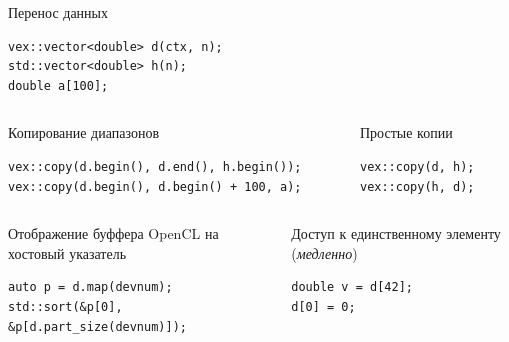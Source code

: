 \documentclass[@BEAMER_OPTIONS@]{beamer}
\begin{document}
\begin{frame}[fragile]{Перенос данных}
    \begin{exampleblock}{}
        \begin{lstlisting}
vex::vector<double> d(ctx, n);
std::vector<double> h(n);
double a[100];
        \end{lstlisting}
    \end{exampleblock}
    \vspace{\baselineskip}
    \begin{columns}
        \begin{column}{0.5\textwidth}
            \begin{exampleblock}{Копирование диапазонов}
                \begin{lstlisting}
vex::copy(d.begin(), d.end(), h.begin());
vex::copy(d.begin(), d.begin() + 100, a);
                \end{lstlisting}
            \end{exampleblock}
        \end{column}
        \begin{column}{0.4\textwidth}
            \begin{exampleblock}{Простые копии}
                \begin{lstlisting}
vex::copy(d, h);
vex::copy(h, d);
                \end{lstlisting}
            \end{exampleblock}
        \end{column}
    \end{columns}
    \vspace{\baselineskip}
    \begin{columns}
        \begin{column}{0.5\textwidth}
            \begin{exampleblock}{Отображение буффера OpenCL на хостовый указатель}
                \begin{lstlisting}
auto p = d.map(devnum);
std::sort(&p[0], &p[d.part_size(devnum)]);
                \end{lstlisting}
            \end{exampleblock}
        \end{column}
        \begin{column}{0.4\textwidth}
            \begin{exampleblock}{Доступ к единственному элементу
                (\emph{медленно})}
                \begin{lstlisting}
double v = d[42];
d[0] = 0;
                \end{lstlisting}
            \end{exampleblock}
        \end{column}
    \end{columns}
\end{frame}
\end{document}
